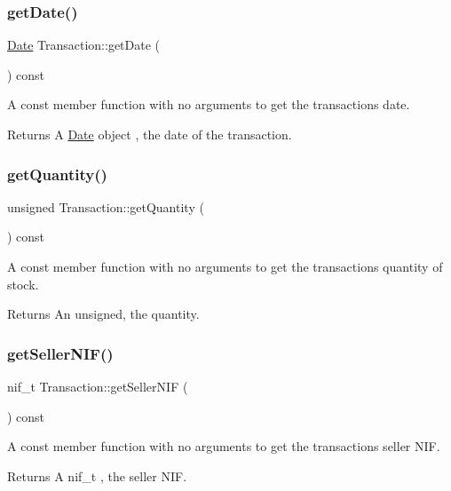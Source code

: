 \subsubsection{\texorpdfstring{get\+Date()}{getDate()}}
{\footnotesize\ttfamily \hyperlink{class_date}{Date} Transaction\+::get\+Date (\begin{DoxyParamCaption}{ }\end{DoxyParamCaption}) const}

A const member function with no arguments to get the transaction\textquotesingle{}s date. \begin{DoxyReturn}{Returns}
A \hyperlink{class_date}{Date} object , the date of the transaction. 
\end{DoxyReturn}
\hypertarget{class_transaction_ab3bfaa0469e1f45c5bd5dc164ac3c850}{}\label{class_transaction_ab3bfaa0469e1f45c5bd5dc164ac3c850} 
\subsubsection{\texorpdfstring{get\+Quantity()}{getQuantity()}}
{\footnotesize\ttfamily unsigned Transaction\+::get\+Quantity (\begin{DoxyParamCaption}{ }\end{DoxyParamCaption}) const}

A const member function with no arguments to get the transaction\textquotesingle{}s quantity of stock. \begin{DoxyReturn}{Returns}
An unsigned, the quantity. 
\end{DoxyReturn}
\hypertarget{class_transaction_a3c3a57a3240bece392c56ff41bc3c21b}{}\label{class_transaction_a3c3a57a3240bece392c56ff41bc3c21b} 
\subsubsection{\texorpdfstring{get\+Seller\+N\+I\+F()}{getSellerNIF()}}
{\footnotesize\ttfamily nif\+\_\+t Transaction\+::get\+Seller\+N\+IF (\begin{DoxyParamCaption}{ }\end{DoxyParamCaption}) const}

A const member function with no arguments to get the transaction\textquotesingle{}s seller N\+IF. \begin{DoxyReturn}{Returns}
A nif\+\_\+t , the seller N\+IF. 
\end{DoxyReturn}
\hypertarget{class_transaction_af6582ddc59e9cfa99a7ef178216799be}{}\label{class_transaction_af6582ddc59e9cfa99a7ef178216799be} 
